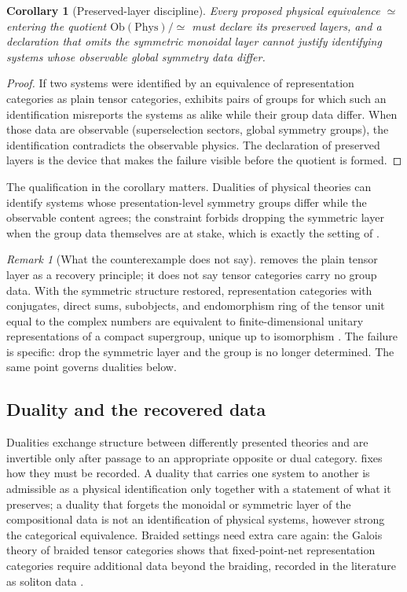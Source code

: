 \documentclass[11pt,letterpaper]{article}
\newtheorem{corollary}[theorem]{Corollary}
\theoremstyle{definition}
\theoremstyle{remark}
\newtheorem{remark}[theorem]{Remark}
\begin{document}
\begin{corollary}[Preserved-layer discipline]
\label{cor:preserved}
Every proposed physical equivalence $\simeq$ entering the quotient $\mathrm{Ob}(\mathrm{Phys})/{\simeq}$ must declare its preserved layers, and a declaration that omits the symmetric monoidal layer cannot justify identifying systems whose observable global symmetry data differ.
\end{corollary}

\begin{proof}
If two systems were identified by an equivalence of representation categories as plain tensor categories,  exhibits pairs of groups for which such an identification misreports the systems as alike while their group data differ. When those data are observable (superselection sectors, global symmetry groups), the identification contradicts the observable physics. The declaration of preserved layers is the device that makes the failure visible before the quotient is formed.
\end{proof}

The qualification in the corollary matters. Dualities of physical theories can identify systems whose presentation-level symmetry groups differ while the observable content agrees; the constraint forbids dropping the symmetric layer when the group data themselves are at stake, which is exactly the setting of .

\begin{remark}[What the counterexample does not say]
\label{rmk:scope}
 removes the plain tensor layer as a recovery principle; it does not say tensor categories carry no group data. With the symmetric structure restored, representation categories with conjugates, direct sums, subobjects, and endomorphism ring of the tensor unit equal to the complex numbers are equivalent to finite-dimensional unitary representations of a compact supergroup, unique up to isomorphism \cite{b1}. The failure is specific: drop the symmetric layer and the group is no longer determined. The same point governs dualities below.
\end{remark}

\subsection{Duality and the recovered data}

Dualities exchange structure between differently presented theories and are invertible only after passage to an appropriate opposite or dual category.  fixes how they must be recorded. A duality that carries one system to another is admissible as a physical identification only together with a statement of what it preserves; a duality that forgets the monoidal or symmetric layer of the compositional data is not an identification of physical systems, however strong the categorical equivalence. Braided settings need extra care again: the Galois theory of braided tensor categories shows that fixed-point-net representation categories require additional data beyond the braiding, recorded in the literature as soliton data \cite{b7}.
\end{document}

